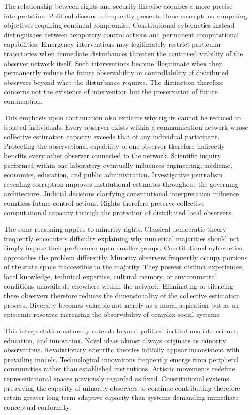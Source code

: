 \documentclass[12pt,a4paper]{article}
\begin{document}
The relationship between rights and security likewise acquires a more precise interpretation. Political discourse frequently presents these concepts as competing objectives requiring continual compromise. Constitutional cybernetics instead distinguishes between temporary control actions and permanent computational capabilities. Emergency interventions may legitimately restrict particular trajectories when immediate disturbances threaten the continued viability of the observer network itself. Such interventions become illegitimate when they permanently reduce the future observability or controllability of distributed observers beyond what the disturbance requires. The distinction therefore concerns not the existence of intervention but the preservation of future continuation.

This emphasis upon continuation also explains why rights cannot be reduced to isolated individuals. Every observer exists within a communication network whose collective estimation capacity exceeds that of any individual participant. Protecting the observational capability of one observer therefore indirectly benefits every other observer connected to the network. Scientific inquiry performed within one laboratory eventually influences engineering, medicine, economics, education, and public administration. Investigative journalism revealing corruption improves institutional estimates throughout the governing architecture. Judicial decisions clarifying constitutional interpretation influence countless future control actions. Rights therefore preserve collective computational capacity through the protection of distributed local observers.

The same reasoning applies to minority rights. Classical democratic theory frequently encounters difficulty explaining why numerical majorities should not simply impose their preferences upon smaller groups. Constitutional cybernetics approaches the problem differently. Minority observers frequently occupy portions of the state space inaccessible to the majority. They possess distinct experiences, local knowledge, technical expertise, cultural memory, or environmental conditions unavailable elsewhere within the network. Eliminating or silencing these observers therefore reduces the dimensionality of the collective estimation process. Diversity becomes valuable not merely as a moral aspiration but as an epistemic resource increasing the observability of complex social systems.

This interpretation naturally extends beyond political institutions into science, education, and innovation. Novel ideas almost always originate as minority observations. Revolutionary scientific theories initially appear inconsistent with prevailing models. Technological innovations frequently emerge from peripheral communities rather than established institutions. Artistic movements redefine representational spaces previously regarded as fixed. Constitutional systems preserving the capacity of minority observers to continue contributing therefore retain greater long-term adaptive capacity than systems demanding immediate conceptual conformity.
\end{document}
